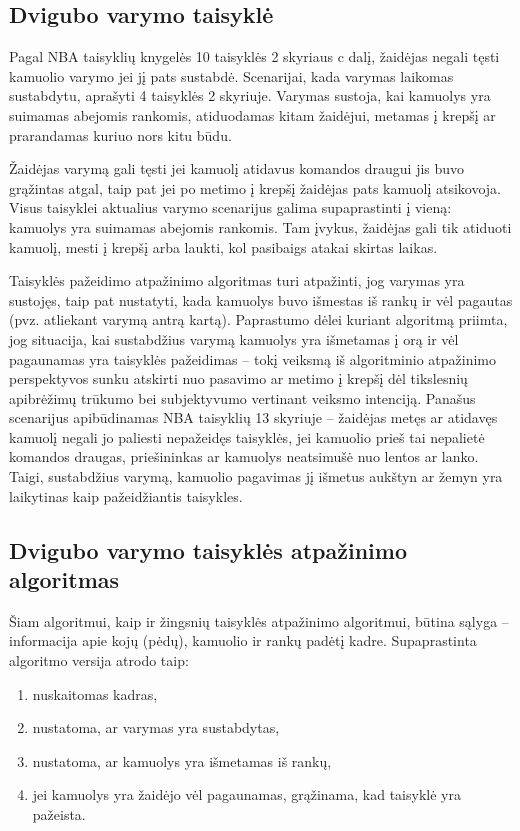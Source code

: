 \documentclass{VUMIFPSbakalaurinis}
\begin{document}
\subsection{Dvigubo varymo taisyklė}
Pagal NBA taisyklių knygelės 10 taisyklės 2 skyriaus c dalį, žaidėjas negali tęsti kamuolio varymo jei jį pats sustabdė. Scenarijai, kada varymas laikomas sustabdytu, aprašyti 4 taisyklės 2 skyriuje. Varymas sustoja, kai kamuolys yra suimamas abejomis rankomis, atiduodamas kitam žaidėjui, metamas į krepšį ar prarandamas kuriuo nors kitu būdu. 

Žaidėjas varymą gali tęsti jei kamuolį atidavus komandos draugui jis buvo grąžintas atgal, taip pat jei po metimo į krepšį žaidėjas pats kamuolį atsikovoja. Visus taisyklei aktualius varymo scenarijus galima supaprastinti į vieną: kamuolys yra suimamas abejomis rankomis. Tam įvykus, žaidėjas gali tik atiduoti kamuolį, mesti į krepšį arba laukti, kol pasibaigs atakai skirtas laikas. 

Taisyklės pažeidimo atpažinimo algoritmas turi atpažinti, jog varymas yra sustojęs, taip pat nustatyti, kada kamuolys buvo išmestas iš rankų ir vėl pagautas (pvz. atliekant varymą antrą kartą). Paprastumo dėlei kuriant algoritmą priimta, jog situacija, kai sustabdžius varymą kamuolys yra išmetamas į orą ir vėl pagaunamas yra taisyklės pažeidimas – tokį veiksmą iš algoritminio atpažinimo perspektyvos sunku atskirti nuo pasavimo ar metimo į krepšį dėl tikslesnių apibrėžimų trūkumo bei subjektyvumo vertinant veiksmo intenciją. Panašus scenarijus apibūdinamas NBA taisyklių 13 skyriuje – žaidėjas metęs ar atidavęs kamuolį negali jo paliesti nepažeidęs taisyklės, jei kamuolio prieš tai nepalietė komandos draugas, priešininkas ar kamuolys neatsimušė nuo lentos ar lanko. Taigi, sustabdžius varymą, kamuolio pagavimas jį išmetus aukštyn ar žemyn yra laikytinas kaip pažeidžiantis taisykles. 

\subsection{Dvigubo varymo taisyklės atpažinimo algoritmas}

Šiam algoritmui, kaip ir žingsnių taisyklės atpažinimo algoritmui, būtina sąlyga – informacija apie kojų (pėdų), kamuolio ir rankų padėtį kadre. Supaprastinta algoritmo versija atrodo taip: 

\begin{enumerate}
 	\item nuskaitomas kadras,
 	\item nustatoma, ar varymas yra sustabdytas,
 	\item nustatoma, ar kamuolys yra išmetamas iš rankų,
 	\item jei kamuolys yra žaidėjo vėl pagaunamas, grąžinama, kad taisyklė yra pažeista.
\end{enumerate}
\end{document}
